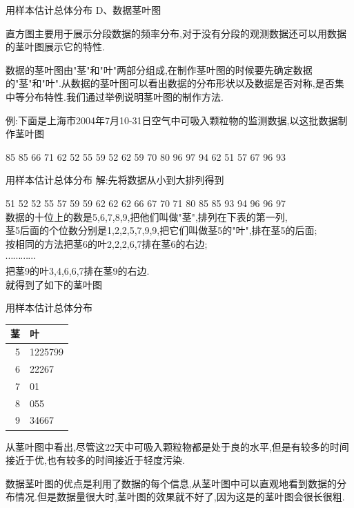 	\begin{frame}{用样本估计总体分布}
		\alert{D、数据茎叶图}
		
		直方图主要用于展示分段数据的频率分布,对于没有分段的观测数据还可以用数据的茎叶图展示它的特性.
		
		数据的\alert{茎叶图}由"茎"和"叶"两部分组成,在制作茎叶图的时候要先确定数据的"茎"和"叶".从数据的茎叶图可以看出数据的分布形状以及数据是否对称,是否集中等分布特性.我们通过举例说明茎叶图的制作方法.
		
		例:下面是上海市2004年7月10-31日空气中可吸入颗粒物的监测数据,以这批数据制作茎叶图
		
		85 85 66 71 62 52 55 59 52 62 59 
		70 80 96 97 94 62 51 57 67 96 93
	\end{frame}

	\begin{frame}{用样本估计总体分布}
	解:先将数据从小到大排列得到
	
	51 52 52 55 57 59 59 62 62 62 66 
	67 70 71 80 85 85 93 94 96 96 97\\
	数据的十位上的数是5,6,7,8,9,把他们叫做"茎",排列在下表的第一列,\\
	茎5后面的个位数分别是1,2,2,5,7,9,9,把它们叫做茎5的"叶",排在茎5的后面;\\
	按相同的方法把茎6的叶2,2,2,6,7排在茎6的右边;\\
	$\cdots\cdots\cdots\cdots$\\
	把茎9的叶3,4,6,6,7排在茎9的右边.\\
	就得到了如下的茎叶图
	\end{frame}

	\begin{frame}{用样本估计总体分布}
		$\quad\quad\quad\quad\quad\quad\quad\quad\quad\quad\quad\quad$\begin{tabular}{r|l}
			\hline 茎 & 叶\\
			\hline 5 & 1225799 \\
			\hline 6 & 22267\\
			\hline 7 & 01\\
			\hline 8 & 055\\
			\hline 9 & 34667\\
			\hline
		\end{tabular}
		
		从茎叶图中看出,尽管这22天中可吸入颗粒物都是处于良的水平,但是有较多的时间接近于优,也有较多的时间接近于轻度污染.
		
		数据茎叶图的优点是利用了数据的每个信息,从茎叶图中可以直观地看到数据的分布情况.但是数据量很大时,茎叶图的效果就不好了,因为这是的茎叶图会很长很粗.
	\end{frame}
	
